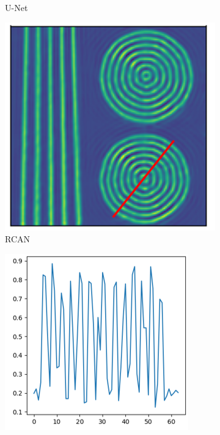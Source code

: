 \documentclass[conference]{IEEEtran}
\begin{document}
\begin{figure}[h!]
\begin{subfigure}[b]{0.151\textwidth}
        \caption{U-Net}
        \label{fig:unet_circle}
    \end{subfigure}
    \begin{subfigure}[b]{0.145\textwidth}
        \centering
        \includegraphics[width=\textwidth]{images/rcan_circle_line.png}
        \caption{RCAN}
        \label{fig:rcan_circle}
    \end{subfigure}
    \begin{subfigure}[b]{0.15\textwidth}
        \centering
        \includegraphics[width=\textwidth]{images/gt_circle_cut.png}

\end{subfigure}
\end{figure}
\end{document}
